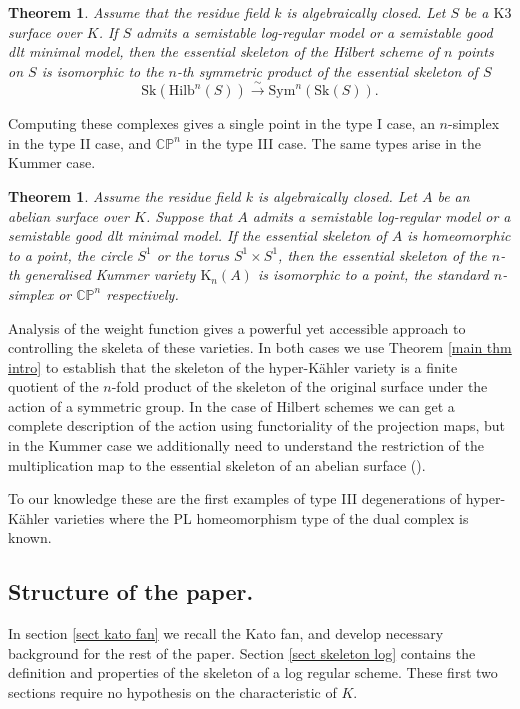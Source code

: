 \documentclass{amsart}%
\numberwithin{equation}{subsection}
\theoremstyle{plain2}
\newtheorem{theorem}[equation]{Theorem}
\theoremstyle{definition2}
\theoremstyle{stepstyle}
\theoremstyle{point}
\theoremstyle{subpoint}
\newcommand{\CP}{\ensuremath{\mathbb{CP}}}
\newcommand{\Hilb}{\ensuremath{\mathrm{Hilb}}}
\newcommand{\Sym}{\mathrm{Sym}}
\newcommand{\Sk}{\mathrm{Sk}}
\begin{document}
\begin{theorem}
Assume that the residue field $k$ is algebraically closed. Let $S$ be a $\text{K}3$ surface over $K$. If $S$ admits a semistable log-regular model or a semistable good dlt minimal model, then the essential skeleton of the Hilbert scheme of $n$ points on $S$ is isomorphic to the $n$-th symmetric product of the essential skeleton of $S$ $$\Sk(\Hilb^n(S)) \xrightarrow{\sim} \Sym^n(\Sk(S)).$$ 
\end{theorem}

Computing these complexes gives a single point in the type I case, an $n$-simplex in the type II case, and $\mathbb{C}\mathbb{P}^n$ in the type III case. The same types arise in the Kummer case.

\begin{theorem}
Assume the residue field $k$ is algebraically closed. Let $A$ be an abelian surface over $K$. Suppose that $A$ admits a semistable log-regular model or a semistable good dlt minimal model. If the essential skeleton of $A$ is homeomorphic to a point, the circle $S^1$ or the torus $S^1 \times S^1$, then the essential skeleton of the $n$-th generalised Kummer variety $\text{K}_n(A)$ is isomorphic to a point, the standard $n$-simplex or $\CP^n$ respectively. 
\end{theorem}

Analysis of the weight function gives a powerful yet accessible approach to controlling the skeleta of these varieties. In both cases we use Theorem \ref{main thm intro} to establish that the skeleton of the hyper-K{\"a}hler variety is a finite quotient of the $n$-fold product of the skeleton of the original surface under the action of a symmetric group. In the case of Hilbert schemes we can get a complete description of the action using functoriality of the projection maps, but in the Kummer case we additionally need to understand the restriction of the multiplication map to the essential skeleton of an abelian surface (\cite{Berkovich1990, HalvardHalleNicaise2017, Temkina}).

To our knowledge these are the first examples of type III degenerations of hyper-K{\"a}hler varieties where the PL homeomorphism type of the dual complex is known. 

\subsection{Structure of the paper.}
In section \ref{sect kato fan} we recall the Kato fan, and develop necessary background for the rest of the paper. Section \ref{sect skeleton log} contains the definition and properties of the skeleton of a log regular scheme. These first two sections require no hypothesis on the characteristic of $K$. 
\end{document}
